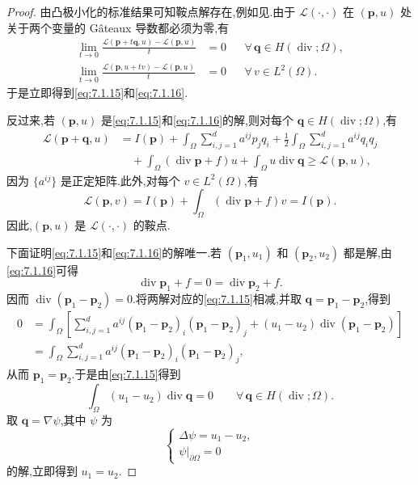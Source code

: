 \begin{proof}
由凸极小化的标准结果可知鞍点解存在,例如见.由于 \(\mathcal L(\cdot,\cdot)\) 在 \((\boldsymbol{p},u)\) 处关于两个变量的 Gâteaux 导数都必须为零,有
\[
  \begin{aligned}
    \lim_{t\to0}\frac{\mathcal L(\boldsymbol{p}+t\boldsymbol{q},u)-\mathcal L(\boldsymbol{p},u)}t
      &=0&&\forall\,\boldsymbol{q}\in H(\operatorname{div};\Omega),\\
    \lim_{t\to0}\frac{\mathcal L(\boldsymbol{p},u+tv)-\mathcal L(\boldsymbol{p},u)}t
      &=0&&\forall\,v\in L^2(\Omega).
  \end{aligned}
\]
于是立即得到\eqref{eq:7.1.15}和\eqref{eq:7.1.16}.

反过来,若 \((\boldsymbol{p},u)\) 是\eqref{eq:7.1.15}和\eqref{eq:7.1.16}的解,则对每个 \(\boldsymbol{q}\in H(\operatorname{div};\Omega)\),有
\[
  \begin{aligned}
    \mathcal L(\boldsymbol{p}+\boldsymbol{q},u)
       &=I(\boldsymbol{p})+\int_\Omega\sum_{i,j=1}^d a^{ij}p_jq_i
           +\frac12\int_\Omega\sum_{i,j=1}^d a^{ij}q_iq_j\\
       &\quad+\int_\Omega(\operatorname{div}\boldsymbol{p}+f)u
           +\int_\Omega u\operatorname{div}\boldsymbol{q}
           \ge\mathcal L(\boldsymbol{p},u),
  \end{aligned}
\]
因为 \(\{a^{ij}\}\) 是正定矩阵.此外,对每个 \(v\in L^2(\Omega)\),有
\[
  \mathcal L(\boldsymbol{p},v)=I(\boldsymbol{p})+\int_\Omega(\operatorname{div}\boldsymbol{p}+f)v=I(\boldsymbol{p}).
\]
因此,\((\boldsymbol{p},u)\) 是 \(\mathcal L(\cdot,\cdot)\) 的鞍点.

下面证明\eqref{eq:7.1.15}和\eqref{eq:7.1.16}的解唯一.若 \((\boldsymbol{p}_1,u_1)\) 和 \((\boldsymbol{p}_2,u_2)\) 都是解,由\eqref{eq:7.1.16}可得
\[
  \operatorname{div}\boldsymbol{p}_1+f=0=\operatorname{div}\boldsymbol{p}_2+f.
\]
因而 \(\operatorname{div}(\boldsymbol{p}_1-\boldsymbol{p}_2)=0\).将两解对应的\eqref{eq:7.1.15}相减,并取 \(\boldsymbol{q}=\boldsymbol{p}_1-\boldsymbol{p}_2\),得到
\[
  \begin{aligned}
    0&=\int_\Omega\left[\sum_{i,j=1}^d a^{ij}(\boldsymbol{p}_1-\boldsymbol{p}_2)_i
       (\boldsymbol{p}_1-\boldsymbol{p}_2)_j+(u_1-u_2)\operatorname{div}(\boldsymbol{p}_1-\boldsymbol{p}_2)\right]\\
     &=\int_\Omega\sum_{i,j=1}^d a^{ij}(\boldsymbol{p}_1-\boldsymbol{p}_2)_i(\boldsymbol{p}_1-\boldsymbol{p}_2)_j,
  \end{aligned}
\]
从而 \(\boldsymbol{p}_1=\boldsymbol{p}_2\).于是由\eqref{eq:7.1.15}得到
\[
  \int_\Omega(u_1-u_2)\operatorname{div}\boldsymbol{q}=0
    \qquad\forall\,\boldsymbol{q}\in H(\operatorname{div};\Omega).
\]
取 \(\boldsymbol{q}=\nabla\psi\),其中 \(\psi\) 为
\[
  \begin{cases}
    \Delta\psi=u_1-u_2,\\
    \psi|_{\partial\Omega}=0
  \end{cases}
\]
的解,立即得到 \(u_1=u_2\).


\end{proof}
